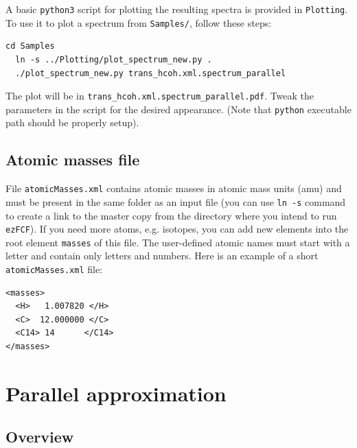 \documentclass[11pt]{article}
\begin{document}
A basic {\tt python3} script for plotting the resulting spectra is provided in {\tt Plotting}. To use it to plot a spectrum from {\tt Samples/}, follow these steps:
\begin{lstlisting}[frame=single,framerule=0pt]
  cd Samples
  ln -s ../Plotting/plot_spectrum_new.py .
  ./plot_spectrum_new.py trans_hcoh.xml.spectrum_parallel
\end{lstlisting}
The plot will be in {\tt trans\_hcoh.xml.spectrum\_parallel.pdf}. Tweak the parameters in the script for the desired appearance. (Note that {\tt python} executable path should be properly setup). 


\subsection{Atomic masses file}
\label{sec:masses}

File {\tt atomicMasses.xml} contains atomic masses in atomic mass units (amu) and must be present in the same folder 
as an \xml input file (you can use {\tt ln -s} command to create a link to the master copy from the directory
where you intend to run {\tt ezFCF}). 
If you need more atoms, e.g. isotopes, you can add new
elements into the root element {\tt masses} of this file. 
The user-defined atomic names must start with a letter and contain only letters and numbers.
Here is an example of a short {\tt atomicMasses.xml} file:
\begin{lstlisting}[frame=single,framerule=0pt]
<masses>
  <H>   1.007820 </H>
  <C>  12.000000 </C>
  <C14> 14      </C14>
</masses>
\end{lstlisting}

\section{Parallel approximation}
\label{sec:parallel}

\subsection{Overview}
\label{sec:para:overview}
\end{document}
